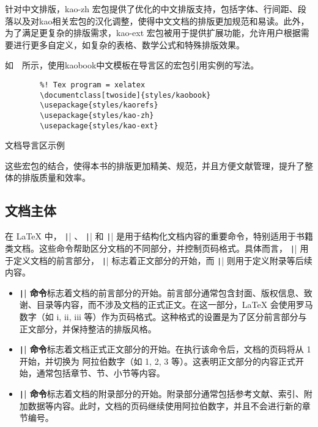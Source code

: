针对中文排版，kao-zh 宏包提供了优化的中文排版支持，包括字体、行间距、段落以及对kao相关宏包的汉化调整，使得中文文档的排版更加规范和易读。此外，为了满足更复杂的排版需求，kao-ext 宏包被用于提供扩展功能，允许用户根据需要进行更多自定义，如复杂的表格、数学公式和特殊排版效果。

如~~所示，使用kaobook中文模板在导言区的宏包引用实例的写法。

\begin{listing}[H]
    \begin{verbatim}
        %! Tex program = xelatex
        \documentclass[twoside]{styles/kaobook}
        \usepackage{styles/kaorefs}
        \usepackage{styles/kao-zh}
        \usepackage{styles/kao-ext}
    \end{verbatim}
    \caption{文档导言区示例}
\end{listing}

这些宏包的结合，使得本书的排版更加精美、规范，并且方便文献管理，提升了整体的排版质量和效率。

\subsection{文档主体}

在 LaTeX 中， \texttt|\frontmatter| 、 \texttt|\mainmatter| 和  \texttt|\backmatter| 是用于结构化文档内容的重要命令，特别适用于书籍类文档。这些命令帮助区分文档的不同部分，并控制页码格式。具体而言， \texttt|\frontmatter| 用于定义文档的前言部分， \texttt|\mainmatter| 标志着正文部分的开始，而 \texttt|\backmatter| 则用于定义附录等后续内容。

\begin{itemize}
    \item \textbf{\texttt|\frontmatter| 命令}标志着文档的前言部分的开始。前言部分通常包含封面、版权信息、致谢、目录等内容，而不涉及文档的正式正文。在这一部分，LaTeX 会使用罗马数字（如 i, ii, iii 等）作为页码格式。这种格式的设置是为了区分前言部分与正文部分，并保持整洁的排版风格。
    \item \textbf{\texttt|\mainmatter| 命令}标志着文档正式正文部分的开始。在执行该命令后，文档的页码将从 1 开始，并切换为 阿拉伯数字（如 1, 2, 3 等）。这表明正文部分的内容正式开始，通常包括章节、节、小节等内容。
    \item \textbf{\texttt|\backmatter| 命令}标志着文档的附录部分的开始。附录部分通常包括参考文献、索引、附加数据等内容。此时，文档的页码继续使用阿拉伯数字，并且不会进行新的章节编号。
\end{itemize}

